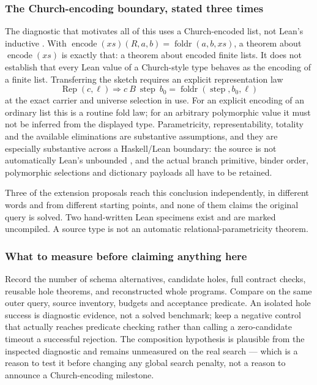 \subsubsection*{The Church-encoding boundary, stated three times}

The diagnostic that motivates all of this uses a Church-encoded list, not Lean's
inductive . With
$\operatorname{encode}(xs)(R,a,b)=\operatorname{foldr}(a,b,xs)$, a theorem about
$\operatorname{encode}(xs)$ is exactly that: a theorem about encoded finite
lists. It does not establish that every Lean value of a Church-style type
behaves as the encoding of a finite list. Transferring the sketch requires an
explicit representation law
\[
 \operatorname{Rep}(c,\ell)\Longrightarrow
 c\ B\ \operatorname{step}\ b_0=\operatorname{foldr}(\operatorname{step},b_0,\ell)
\]
at the exact carrier and universe selection in use. For an explicit encoding of
an ordinary list this is a routine fold law; for an arbitrary polymorphic value
it must not be inferred from the displayed type. Parametricity,
representability, totality and the available eliminations are substantive
assumptions, and they are especially substantive across a Haskell/Lean
boundary: the source  is not automatically Lean's unbounded
, and the actual branch primitive, binder order, polymorphic
selections and dictionary payloads all have to be retained.

Three of the extension proposals reach this conclusion independently, in
different words and from different starting points, and none of them claims the
original query is solved. Two hand-written Lean specimens exist and are marked
uncompiled. A source type is not an automatic relational-parametricity theorem.

\subsubsection*{What to measure before claiming anything here}

Record the number of schema alternatives, candidate holes, full contract checks,
reusable hole theorems, and reconstructed whole programs. Compare on the same
outer query, source inventory, budgets and acceptance predicate. An isolated
hole success is diagnostic evidence, not a solved benchmark; keep a negative
control that actually reaches predicate checking rather than calling a
zero-candidate timeout a successful rejection. The composition hypothesis is
plausible from the inspected diagnostic and remains unmeasured on the real
search --- which is a reason to test it before changing any global search
penalty, not a reason to announce a Church-encoding milestone.

